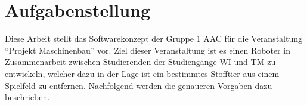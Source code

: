 \section{Aufgabenstellung}\label{sec:task}

Diese Arbeit stellt das Softwarekonzept der Gruppe 1 \ac{AAC} für die Veranstaltung \enquote{Projekt Maschinenbau} vor.
Ziel dieser Veranstaltung ist es einen Roboter in Zusammenarbeit zwischen Studierenden der Studiengänge \ac{WI} und \ac{TM} zu entwickeln, welcher dazu in der Lage ist ein bestimmtes Stofftier aus einem Spielfeld zu entfernen.
Nachfolgend werden die genaueren Vorgaben dazu beschrieben.

